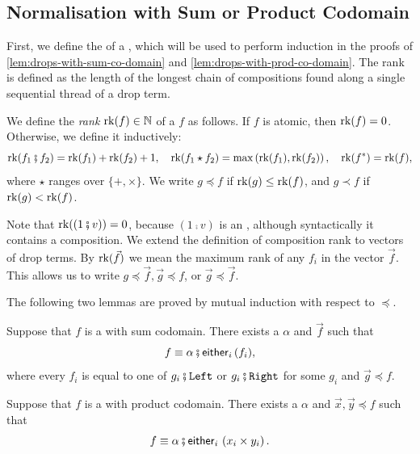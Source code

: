 \subsection{Normalisation with Sum or Product Codomain}\label{sec:appendix:drops-with-sum-or-product-co-domain}

First, we define the  of a , which will be used to perform induction in the proofs of \cref{lem:drops-with-sum-co-domain} and \cref{lem:drops-with-prod-co-domain}. The rank is defined as the length of the longest chain of compositions found along a single sequential thread of a drop term.

\begin{definition}
	We define the \emph{rank} $\mathrm{rk}(f) \in \mathbb{N}$ of a  $f$ as follows. If $f$ is atomic, then $\mathrm{rk}(f) = 0$. Otherwise, we define it inductively:
	\[
		\rk(f_1 \comp f_2) = \rk(f_1) + \rk(f_2) + 1, \quad \rk(f_1 \star f_2) = \max \left( \rk(f_1), \rk(f_2) \right), \quad \rk(f^*) = \rk(f),
	\]
	where $\star$ ranges over $\{ +, \times \}$. We write $g \preceq f$ if $\mathrm{rk}(g) \le \mathrm{rk}(f)$, and $g \prec f$ if $\mathrm{rk}(g) < \mathrm{rk}(f)$.
\end{definition}

Note that $\rk((1\comp{}v)) = 0$, because $(1\comp{}v)$ is an , although syntactically it contains a composition. We extend the definition of composition rank to vectors of drop terms. By $\mathrm{rk}(\vec f)$ we mean the maximum rank of any $f_i$ in the vector $\vec f$. This allows us to write $g \preceq \vec f, \vec g \preceq f$, or $\vec g \preceq \vec f$.

The following two lemmas are proved by mutual induction with respect to $\preceq$. 

\begin{lemma}\label{lem:drops-with-sum-co-domain}
	Suppose that $f$ is a  with sum codomain. There exists a  $\alpha$ and  $\vec f$ such that 
	\[
		f \equiv \alpha \comp \eithermany{i}{(f_i)},
	\]
	where every $f_i$ is equal to one of $g_i \comp \leftterm$ or $g_i \comp \rightterm$ for some  $g_i$ and $\vec g \preceq f$.
\end{lemma}

\begin{lemma}\label{lem:drops-with-prod-co-domain}
	Suppose that $f$ is a  with product codomain. There exists a  $\alpha$ and  $\vec x, \vec y \preceq f$ such that 
	\[ 
		f \equiv \alpha \comp \eithermany{i}{\left( x_i \times y_i \right)}.
	\]
\end{lemma}

